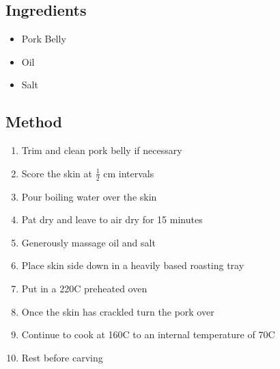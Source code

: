 \documentclass[11pt,a4paper]{article}
\begin{document}
\subsection*{Ingredients}

\begin{itemize}
  \item Pork Belly
  \item Oil
  \item Salt
\end{itemize}

\medskip

\subsection*{Method}

\begin{enumerate}
  \item Trim and clean pork belly if necessary
  \item Score the skin at $ \frac {1}{2} $ cm intervals
  \item Pour boiling water over the skin
  \item Pat dry and leave to air dry for 15 minutes
  \item Generously massage oil and salt
  \item Place skin side down in a heavily based roasting tray
  \item Put in a 220\textdegree C preheated oven
  \item Once the skin has crackled turn the pork over
  \item Continue to cook at 160\textdegree C to an internal temperature of 70\textdegree C
  \item Rest before carving
\end{enumerate}
\end{document}
